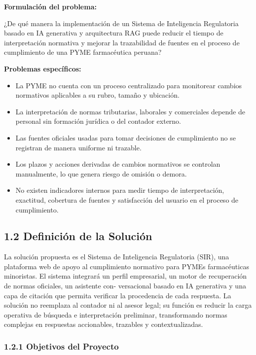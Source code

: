 \documentclass[12pt,a4paper,oneside]{report}
\begin{document}
\textbf{Formulación del problema:}

¿De qué manera la implementación de un Sistema de Inteligencia
Regulatoria basado en IA generativa y arquitectura RAG puede reducir el
tiempo de interpretación normativa y mejorar la trazabilidad de fuentes
en el proceso de cumplimiento de una PYME farmacéutica peruana?

\textbf{Problemas específicos:}

\begin{itemize}
\item
  La PYME no cuenta con un proceso centralizado para monitorear cambios
  normativos aplicables a su rubro, tamaño y ubicación.
\item
  La interpretación de normas tributarias, laborales y comerciales
  depende de personal sin formación jurídica o del contador externo.
\item
  Las fuentes oficiales usadas para tomar decisiones de cumplimiento no
  se registran de manera uniforme ni trazable.
\item
  Los plazos y acciones derivadas de cambios normativos se controlan
  manualmente, lo que genera riesgo de omisión o demora.
\item
  No existen indicadores internos para medir tiempo de interpretación,
  exactitud, cobertura de fuentes y satisfacción del usuario en el
  proceso de cumplimiento.
\end{itemize}

\subsection{1.2 Definición de la
Solución}\label{definiciuxf3n-de-la-soluciuxf3n}

La solución propuesta es el Sistema de Inteligencia Regulatoria (SIR),
una plataforma web de apoyo al cumplimiento normativo para PYMEs
farmacéuticas minoristas. El sistema integrará un perfil empresarial, un
motor de recuperación de normas oficiales, un asistente con- versacional
basado en IA generativa y una capa de citación que permita verificar la
procedencia de cada respuesta. La solución no reemplaza al contador ni
al asesor legal; su función es reducir la carga operativa de búsqueda e
interpretación preliminar, transformando normas complejas en respuestas
accionables, trazables y contextualizadas.

\subsubsection{1.2.1 Objetivos del
Proyecto}\label{objetivos-del-proyecto}
\end{document}
